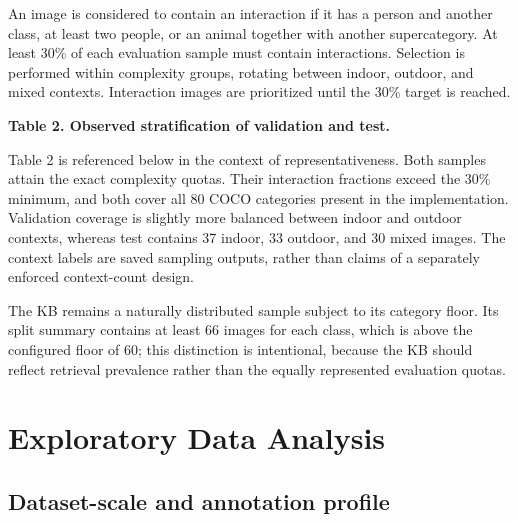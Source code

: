 \documentclass{article}
\begin{document}
An image is considered to contain an interaction if it has a person and
another class, at least two people, or an animal together with another
supercategory. At least 30\% of each evaluation sample must contain
interactions. Selection is performed within complexity groups, rotating
between indoor, outdoor, and mixed contexts. Interaction images are
prioritized until the 30\% target is reached.

\begin{center}
\textbf{Table 2. Observed stratification of validation and test.}
\end{center}

\begin{table}[htbp]
\centering
{}
\end{table}

Table 2 is referenced below in the context of representativeness. Both
samples attain the exact complexity quotas. Their interaction fractions
exceed the 30\% minimum, and both cover all 80 COCO categories present
in the implementation. Validation coverage is slightly more balanced
between indoor and outdoor contexts, whereas test contains 37 indoor, 33
outdoor, and 30 mixed images. The context labels are saved sampling
outputs, rather than claims of a separately enforced context-count
design.

The KB remains a naturally distributed sample subject to its category
floor. Its split summary contains at least 66 images for each class,
which is above the configured floor of 60; this distinction is
intentional, because the KB should reflect retrieval prevalence rather
than the equally represented evaluation quotas.

\section{Exploratory Data Analysis}\label{exploratory-data-analysis}

\subsection{Dataset-scale and annotation
profile}\label{dataset-scale-and-annotation-profile}
\end{document}
